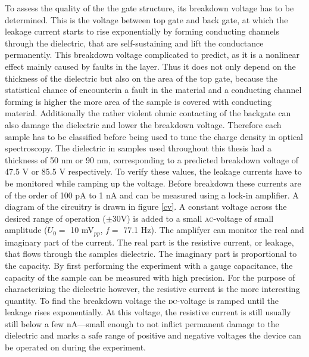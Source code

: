 To assess the quality of the the gate structure, its breakdown voltage has to be determined. This is the voltage between top gate and back gate, at which the leakage current starts to rise exponentially by forming conducting channels through the dielectric, that are self-sustaining and lift the conductance permanently\cite{klein_maximum_1966}. This breakdown voltage complicated to predict, as it is a nonlinear effect mainly caused by faults in the \sio layer. Thus it does not only depend on the thickness of the dielectric but also on the area of the top gate, because the statistical chance of encounterin a fault in the material and a conducting channel forming is higher the more area of the sample is covered with conducting material. Additionally the rather violent ohmic contacting of the backgate can also damage the dielectric and lower the breakdown voltage. Therefore each sample has to be classified before being used to tune the charge density in optical spectroscopy. The dielectric in samples used throughout this thesis had a thickness of 50 nm or 90 nm, corresponding to a predicted breakdown voltage of 47.5 V or 85.5 V respectively. To verify these values, the leakage currents have to be monitored while ramping up the voltage. Before breakdown these currents are of the order of 100 pA to 1 nA and can be measured using a lock-in amplifier. A diagram of the circuitry is drawn in figure \ref{cv}. A constant voltage across the desired range of operation ({\small$\pm $}30V) is added to a small \textsc{ac}-voltage of small amplitude ($U_0 = $ 10 mV$_{pp}$, $f = $ 77.1 Hz). The amplifyer can monitor the real and imaginary part of the current. The real part is the resistive current, or leakage, that flows through the samples dielectric. The imaginary part is proportional to the capacity. By first performing the experiment with a gauge capacitance, the capacity of the sample can be measured with high precision. For the purpose of characterizing the dielectric however, the resistive current is the more interesting quantity. To find the breakdown voltage the \textsc{dc}-voltage is ramped until the leakage rises exponentially. At this voltage, the resistive current is still usually still below a few nA---small enough to not inflict permanent damage to the dielectric and marks a safe range of positive and negative voltages the device can be operated on during the experiment.

